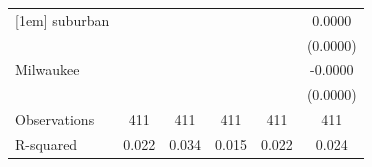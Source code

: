 {\begin{tabular}{l*{5}{c}}
[1em]
suburban            &                     &                     &                     &                     &      0.0000         \\
                    &                     &                     &                     &                     &    (0.0000)         \\
[1em]
Milwaukee           &                     &                     &                     &                     &     -0.0000         \\
                    &                     &                     &                     &                     &    (0.0000)         \\
\hline
Observations        &         411         &         411         &         411         &         411         &         411         \\
R-squared           &       0.022         &       0.034         &       0.015         &       0.022         &       0.024         \\
\hline\hline
\end{tabular}
}
